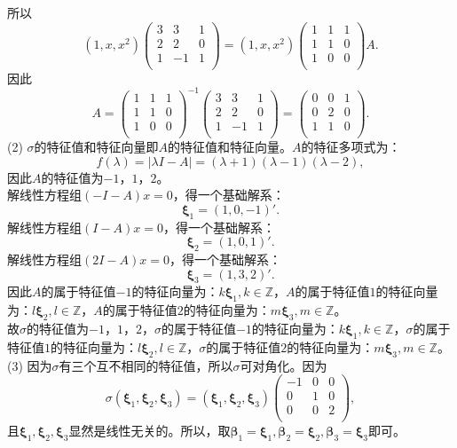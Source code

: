 \begin{enumerate}[1~]
\begin{solution}
\[\]
所以\[
(1, x, x^2)\left( \begin{matrix}
	3&		3&		1\\
	2&		2&		0\\
	1&		-1&		1\\
\end{matrix} \right) =\left( 1,x,x^2 \right) \left( \begin{matrix}
	1&		1&		1\\
	1&		1&		0\\
	1&		0&		0\\
\end{matrix} \right) A.
\]
因此\[
A=\left( \begin{matrix}
	1&		1&		1\\
	1&		1&		0\\
	1&		0&		0\\
\end{matrix} \right) ^{-1}\left( \begin{matrix}
	3&		3&		1\\
	2&		2&		0\\
	1&		-1&		1\\
\end{matrix} \right) =\left(
\begin{matrix}
 0 & 0 & 1 \\
 0 & 2 & 0 \\
 1 & 1 & 0 \\
\end{matrix}
\right).
\]
(2) $\sigma$的特征值和特征向量即$A$的特征值和特征向量。$A$的特征多项式为：\[
f(\lambda)=|\lambda I-A|=(\lambda+1)(\lambda-1)(\lambda-2),
\]
因此$A$的特征值为$-1$，$1$，$2$。\\
解线性方程组$(-I-A)x=0$，得一个基础解系：\[
\boldsymbol{\xi}_1=(1, 0, -1)'.
\]
解线性方程组$(I-A)x=0$，得一个基础解系：\[
\boldsymbol{\xi}_2=(1, 0, 1)'.
\]
解线性方程组$(2I-A)x=0$，得一个基础解系：\[
\boldsymbol{\xi}_3=(1, 3, 2)'.
\]
因此$A$的属于特征值$-1$的特征向量为：$k\boldsymbol{\xi}_1, k\in \mathbb{Z}$，$A$的属于特征值$1$的特征向量为：$l\boldsymbol{\xi}_2, l\in \mathbb{Z}$，$A$的属于特征值$2$的特征向量为：$m\boldsymbol{\xi}_3, m\in \mathbb{Z}$。\\
故$\sigma$的特征值为$-1$，$1$，$2$，$\sigma$的属于特征值$-1$的特征向量为：$k\boldsymbol{\xi}_1, k\in \mathbb{Z}$，$\sigma$的属于特征值$1$的特征向量为：$l\boldsymbol{\xi}_2, l\in \mathbb{Z}$，$\sigma$的属于特征值$2$的特征向量为：$m\boldsymbol{\xi}_3, m\in \mathbb{Z}$。\\
(3) 因为$\sigma$有三个互不相同的特征值，所以$\sigma$可对角化。因为\[
\sigma(\boldsymbol{\xi}_1, \boldsymbol{\xi}_2, \boldsymbol{\xi}_3)=(\boldsymbol{\xi}_1, \boldsymbol{\xi}_2, \boldsymbol{\xi}_3)\left( \begin{matrix}
	-1&		0&		0\\
	0&		1&		0\\
	0&		0&		2\\
\end{matrix} \right) ,
\]
且$\boldsymbol{\xi}_1, \boldsymbol{\xi}_2, \boldsymbol{\xi}_3$显然是线性无关的。所以，取$\boldsymbol{\beta}_1=\boldsymbol{\xi}_1, \boldsymbol{\beta}_2=\boldsymbol{\xi}_2, \boldsymbol{\beta}_3=\boldsymbol{\xi}_3$即可。
\end{solution}


\end{enumerate}
